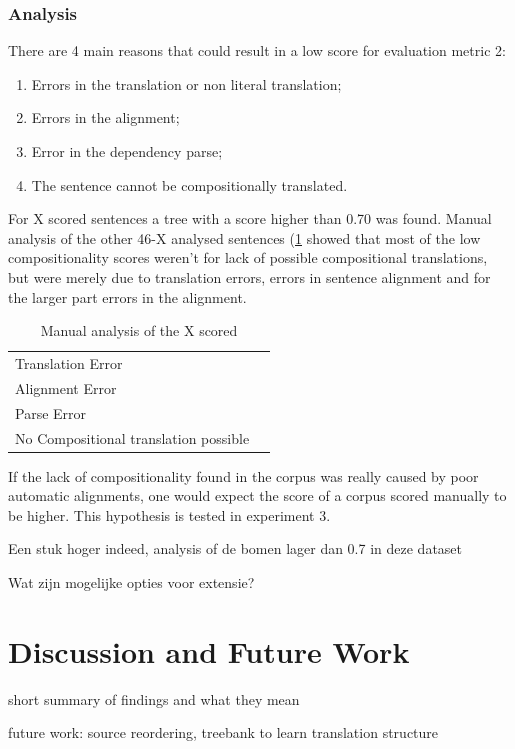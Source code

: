 \documentclass{report}
\theoremstyle{definition}
\theoremstyle{plain}
\begin{document}
\subsection{Analysis}

There are 4 main reasons that could result in a low score for evaluation metric 2:
\begin{enumerate}
\item Errors in the translation or non literal translation;
\item Errors in the alignment;
\item Error in the dependency parse;
\item The sentence cannot be compositionally translated.
\end{enumerate}

For X scored sentences a tree with a score higher than 0.70 was found. Manual analysis of the other 46-X analysed sentences (\ref{tab:class} showed that most of the low compositionality scores weren't for lack of possible compositional translations, but were merely due to translation errors, errors in sentence alignment and for the larger part errors in the alignment.

\begin{table}[!h]\label{tab:class}
\begin{tabular}{|l|l|}
\hline
Translation Error & \\
Alignment Error & \\
Parse Error &\\
No Compositional translation possible & \\
\hline
\end{tabular}
\caption{Manual analysis of the X scored}
\end{table}

If the lack of compositionality found in the corpus was really caused by poor automatic alignments, one would expect the score of a corpus scored manually to be higher. This hypothesis is tested in experiment 3.

Een stuk hoger indeed, analysis of de bomen lager dan 0.7 in deze dataset

Wat zijn mogelijke opties voor extensie?

\chapter{Discussion and Future Work}

short summary of findings and what they mean

future work: source reordering, treebank to learn translation structure
\end{document}

